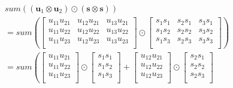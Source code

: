 \begin{align*}
   & sum\left((\textbf{u}_1 \otimes \textbf{u}_2) \odot (\textbf{s} \otimes \textbf{s} )\right) \\
   & = sum\left(\begin{bmatrix}
                    u_{11}u_{21} & u_{12}u_{21} & u_{13}u_{21} \\
                    u_{11}u_{22} & u_{12}u_{22} & u_{13}u_{22} \\
                    u_{11}u_{23} & u_{12}u_{23} & u_{13}u_{23} \\
                  \end{bmatrix} \odot \begin{bmatrix}
                                        s_{1}s_{1} & s_{2}s_{1} & s_{3}s_{1} \\
                                        s_{1}s_{2} & s_{2}s_{2} & s_{3}s_{2} \\
                                        s_{1}s_{3} & s_{2}s_{3} & s_{3}s_{3} \\
                                      \end{bmatrix}\right)                     \\
   & = sum\left(\begin{bmatrix}
                    u_{11}u_{21} \\
                    u_{11}u_{22} \\
                    u_{11}u_{23} \\
                  \end{bmatrix} \odot \begin{bmatrix}
                                        s_{1}s_{1} \\
                                        s_{1}s_{2} \\
                                        s_{1}s_{3} \\
                                      \end{bmatrix}
  + \begin{bmatrix}
        u_{12}u_{21} \\
        u_{12}u_{22} \\
        u_{12}u_{23} \\
      \end{bmatrix} \odot \begin{bmatrix}
                            s_{2}s_{1} \\
                            s_{2}s_{2} \\
                            s_{2}s_{3} \\

\end{bmatrix}
\end{align*}
